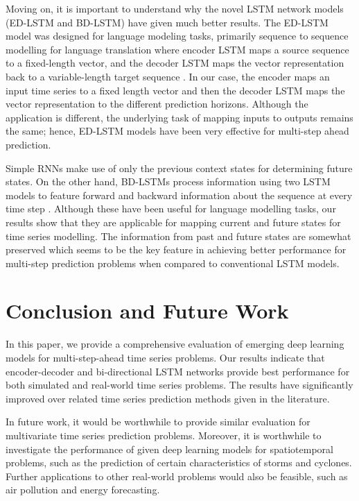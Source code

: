 \documentclass{ieeeaccess}
\begin{document}
  Moving on, it is important to understand why the novel LSTM network models (ED-LSTM and BD-LSTM)  have given much better results. The ED-LSTM model was designed for language modeling tasks, primarily sequence to sequence  modelling for language translation where  encoder LSTM maps a source sequence to a fixed-length vector, and the decoder LSTM maps the vector representation back to a variable-length target sequence \cite{sutskever2014sequence}. In our case, the encoder maps an input time series to a fixed length vector and then the decoder LSTM maps the vector representation to the different prediction horizons. Although the application is different, the underlying task of mapping inputs to outputs remains the same; hence, ED-LSTM models have been very effective for multi-step ahead prediction. 
  
  Simple RNNs make use of only the previous context states for determining future states. On the other hand, BD-LSTMs process information using two  LSTM models to feature forward and backward information about the sequence at every time step \cite{graves2005framewise}. Although these have been useful for language modelling tasks, our results show that they are   applicable for mapping current and  future states for time series modelling. The  information from past and future states are somewhat preserved which seems to be the key feature in achieving better performance for multi-step prediction problems when compared to conventional LSTM models. 
 
  
 
 \section{Conclusion and Future Work}
 
 In this paper, we  provide a comprehensive evaluation of emerging deep learning models for multi-step-ahead time series problems. Our results indicate that encoder-decoder and bi-directional LSTM networks provide   best performance for both simulated and real-world time series problems. The results have significantly improved over related time series prediction methods given in the literature. 
 
 In future work, it would be worthwhile to provide similar evaluation for multivariate time series prediction problems. Moreover, it is worthwhile to investigate the performance of given deep learning models for spatiotemporal problems, such as the prediction of certain characteristics of storms and cyclones. Further applications to other real-world problems would also be feasible, such as air pollution and energy forecasting.  
\end{document}
